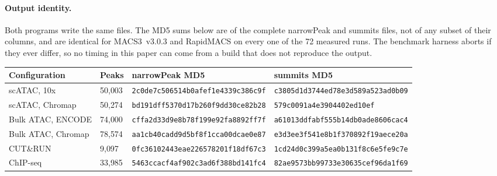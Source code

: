 \documentclass[10pt]{article}
\begin{document}
\paragraph{Output identity.}
Both programs write the same files. The MD5 sums below are of the complete narrowPeak and summits files, not of any subset of their columns, and are identical for MACS3~v3.0.3 and RapidMACS on every one of the 72 measured runs. The benchmark harness aborts if they ever differ, so no timing in this paper can come from a build that does not reproduce the output.

\begin{center}\small
\begin{tabular}{@{}llll@{}}
\toprule
\textbf{Configuration} & \textbf{Peaks} & \textbf{narrowPeak MD5} & \textbf{summits MD5} \\
\midrule
scATAC, 10x & 50{,}003 & \texttt{2c0de7c5\allowbreak 06514b0a\allowbreak fef1e433\allowbreak 9c386c9f} & \texttt{c3805d1d\allowbreak 3744ed78\allowbreak e3d589a5\allowbreak 23ad0b09} \\
scATAC, Chromap & 50{,}274 & \texttt{bd191dff\allowbreak 5370d17b\allowbreak 260f9dd3\allowbreak 0ce82b28} & \texttt{579c0091\allowbreak 16544117\allowbreak a4e39044\allowbreak 02ed10ef} \\
Bulk ATAC, ENCODE & 74{,}000 & \texttt{cffa2d33\allowbreak d9e8b78f\allowbreak 199e92fa\allowbreak 8892ff7f} & \texttt{a61013dd\allowbreak fabf555b\allowbreak 14db0ade\allowbreak 8606cac4} \\
Bulk ATAC, Chromap & 78{,}574 & \texttt{aa1cb40c\allowbreak add9d5bf\allowbreak 8f1cca00\allowbreak dcae0e87} & \texttt{e3d3ee3f\allowbreak 541e8b1f\allowbreak 370892f1\allowbreak 9aece20a} \\
CUT\&RUN & 9{,}097 & \texttt{0fc36102\allowbreak 443eae22\allowbreak 6578201f\allowbreak 18df67c3} & \texttt{1cd24d0c\allowbreak 399a5ea0\allowbreak b131f8c6\allowbreak e5fe9c7e} \\
ChIP-seq & 33{,}985 & \texttt{5463ccac\allowbreak f4af902c\allowbreak 3ad6f388\allowbreak bd141fc4} & \texttt{82ae9573\allowbreak bb99733e\allowbreak 30635cef\allowbreak 96da1f69} \\
\bottomrule
\end{tabular}
\end{center}
\end{document}
